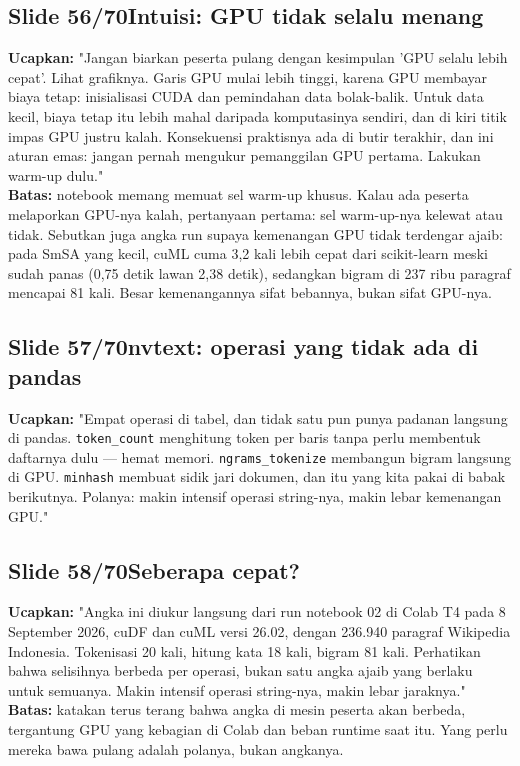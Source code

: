 \documentclass[11pt]{article}
\renewcommand{\framebox}[1]{\colorbox{acc!15}{\textcolor{acc}{\textbf{#1}}}}
\begin{document}
\subsection*{\framebox{Slide 56/70}\quad Intuisi: GPU tidak selalu menang}
\textbf{Ucapkan:} "Jangan biarkan peserta pulang dengan kesimpulan 'GPU selalu lebih cepat'. Lihat grafiknya. Garis GPU mulai lebih tinggi, karena GPU membayar biaya tetap: inisialisasi CUDA dan pemindahan data bolak-balik. Untuk data kecil, biaya tetap itu lebih mahal daripada komputasinya sendiri, dan di kiri titik impas GPU justru kalah. Konsekuensi praktisnya ada di butir terakhir, dan ini aturan emas: jangan pernah mengukur pemanggilan GPU pertama. Lakukan warm-up dulu."\\[2pt]
\textbf{Batas:} notebook memang memuat sel warm-up khusus. Kalau ada peserta melaporkan GPU-nya kalah, pertanyaan pertama: sel warm-up-nya kelewat atau tidak. Sebutkan juga angka run supaya kemenangan GPU tidak terdengar ajaib: pada SmSA yang kecil, cuML cuma 3,2 kali lebih cepat dari scikit-learn meski sudah panas (0,75 detik lawan 2,38 detik), sedangkan bigram di 237 ribu paragraf mencapai 81 kali. Besar kemenangannya sifat bebannya, bukan sifat GPU-nya.\\[2pt]

\subsection*{\framebox{Slide 57/70}\quad nvtext: operasi yang tidak ada di pandas}
\textbf{Ucapkan:} "Empat operasi di tabel, dan tidak satu pun punya padanan langsung di pandas. \texttt{token\_count} menghitung token per baris tanpa perlu membentuk daftarnya dulu — hemat memori. \texttt{ngrams\_tokenize} membangun bigram langsung di GPU. \texttt{minhash} membuat sidik jari dokumen, dan itu yang kita pakai di babak berikutnya. Polanya: makin intensif operasi string-nya, makin lebar kemenangan GPU."\\[2pt]

\subsection*{\framebox{Slide 58/70}\quad Seberapa cepat?}
\textbf{Ucapkan:} "Angka ini diukur langsung dari run notebook 02 di Colab T4 pada 8 September 2026, cuDF dan cuML versi 26.02, dengan 236.940 paragraf Wikipedia Indonesia. Tokenisasi 20 kali, hitung kata 18 kali, bigram 81 kali. Perhatikan bahwa selisihnya berbeda per operasi, bukan satu angka ajaib yang berlaku untuk semuanya. Makin intensif operasi string-nya, makin lebar jaraknya."\\[2pt]
\textbf{Batas:} katakan terus terang bahwa angka di mesin peserta akan berbeda, tergantung GPU yang kebagian di Colab dan beban runtime saat itu. Yang perlu mereka bawa pulang adalah polanya, bukan angkanya.\\[2pt]
\end{document}
